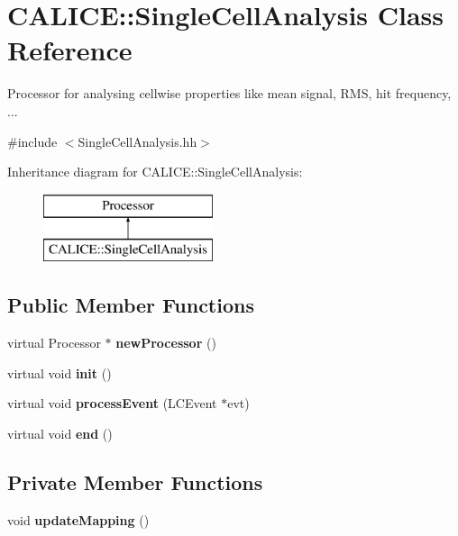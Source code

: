 \section{C\-A\-L\-I\-C\-E\-:\-:Single\-Cell\-Analysis Class Reference}
\label{classCALICE_1_1SingleCellAnalysis}


Processor for analysing cellwise properties like mean signal, R\-M\-S, hit frequency, ...  




{\ttfamily \#include $<$Single\-Cell\-Analysis.\-hh$>$}

Inheritance diagram for C\-A\-L\-I\-C\-E\-:\-:Single\-Cell\-Analysis\-:\begin{figure}[H]
\begin{center}
\leavevmode
\includegraphics[height=2.000000cm]{classCALICE_1_1SingleCellAnalysis}
\end{center}
\end{figure}
\subsection*{Public Member Functions}
\begin{DoxyCompactItemize}
\item 
virtual Processor $\ast$ {\bfseries new\-Processor} ()\label{classCALICE_1_1SingleCellAnalysis_a3bbce1e034c8128d3ebbe5458500bbd6}

\item 
virtual void {\bfseries init} ()\label{classCALICE_1_1SingleCellAnalysis_a6c48b1978e7397423867c299610f7674}

\item 
virtual void {\bfseries process\-Event} (L\-C\-Event $\ast$evt)\label{classCALICE_1_1SingleCellAnalysis_a047a203f24f82572248c0acae8514257}

\item 
virtual void {\bfseries end} ()\label{classCALICE_1_1SingleCellAnalysis_a7a5e0996495546514a5974d9ea3c5ce9}

\end{DoxyCompactItemize}
\subsection*{Private Member Functions}
\begin{DoxyCompactItemize}
\item 
void {\bfseries update\-Mapping} ()\label{classCALICE_1_1SingleCellAnalysis_a432527a7d5023108adb6028e544786c4}

\end{DoxyCompactItemize}
